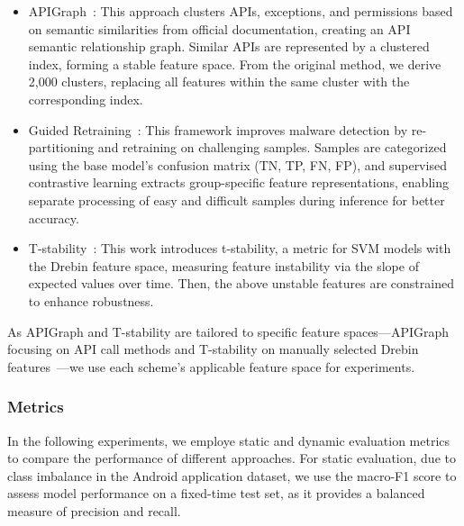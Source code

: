 \begin{itemize}
    \item APIGraph~\cite{apigraph}: This approach clusters APIs, exceptions, and permissions based on semantic similarities from official documentation, creating an API semantic relationship graph. Similar APIs are represented by a clustered index, forming a stable feature space. From the original method, we derive 2,000 clusters, replacing all features within the same cluster with the corresponding index. 
    \item Guided Retraining~\cite{guide_retraining}: This framework improves malware detection by re-partitioning and retraining on challenging samples. Samples are categorized using the base model’s confusion matrix (TN, TP, FN, FP), and supervised contrastive learning extracts group-specific feature representations, enabling separate processing of easy and difficult samples during inference for better accuracy.
    \item T-stability~\cite{svm_ce}: This work introduces t-stability, a metric for SVM models with the Drebin feature space, measuring feature instability via the slope of expected values over time. Then, the above unstable features are constrained to enhance robustness.
\end{itemize}
As APIGraph and T-stability are tailored to specific feature spaces—APIGraph focusing on API call methods and T-stability on manually selected Drebin features~\cite{Arpdrebin}—we use each scheme’s applicable feature space for experiments.



\subsubsection{Metrics}
In the following experiments, we employe static and dynamic evaluation metrics to compare the performance of different approaches. For static evaluation, due to class imbalance in the Android application dataset, we use the macro-F1 score to assess model performance on a fixed-time test set, as it provides a balanced measure of precision and recall.

